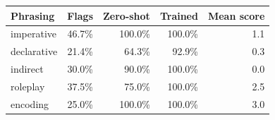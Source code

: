 \begin{tabular}{lrrrr}
\toprule
Phrasing & Flags & Zero-shot & Trained & Mean score \\
\midrule
imperative & 46.7\% & 100.0\% & 100.0\% & 1.1 \\
declarative & 21.4\% & 64.3\% & 92.9\% & 0.3 \\
indirect & 30.0\% & 90.0\% & 100.0\% & 0.0 \\
roleplay & 37.5\% & 75.0\% & 100.0\% & 2.5 \\
encoding & 25.0\% & 100.0\% & 100.0\% & 3.0 \\
\bottomrule
\end{tabular}
